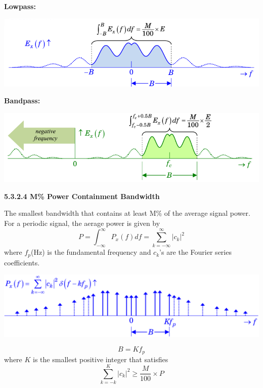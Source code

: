\documentclass[landscape,a4paper]{extarticle}
\newenvironment{Figure}
  {\par\medskip\noindent\minipage{\linewidth}}
  {\endminipage\par\medskip}
\begin{document}
\begin{multicols*}{5}
    \textbf{Lowpass:}
    \begin{Figure}
        \centering
        \includegraphics[width=\linewidth]{images/MPercentEnergy_lowpass.png}
    \end{Figure}
    \textbf{Bandpass:}
    \begin{Figure}
        \centering
        \includegraphics[width=\linewidth]{images/MPercentEnergy_bandpass.png}
    \end{Figure}

    \textbf{5.3.2.4 M\% Power Containment Bandwidth}

    The smallest bandwidth that contains at least M\% of the average signal power. For a periodic signal, the aerage power is given by
    \[
        P = \int_{-\infty}^{\infty}P_x(f)df=\sum_{k=-\infty}^{\infty}|c_k|^2
    \]
    where $f_p$(Hz) is the fundamental frequency and $c_k$'s are the Fourier series coefficients.
    \begin{Figure}
        \centering
        \includegraphics[width=\linewidth]{images/MPercentPower.png}
    \end{Figure}
    \[
        B = Kf_p
    \]
    where $K$ is the smallest positive integer that satisfies 
    \[
        \sum_{k=-k}^{K}|c_k|^2 \geq \frac{M}{100} \times P
    \]


\end{multicols*}
\end{document}
